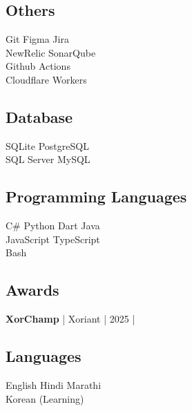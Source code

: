 \documentclass[]{deedy-resume-reversed}
\begin{document}
\begin{minipage}[t]{0.33\textwidth}
\subsection{Others}
Git \textbullet Figma \textbullet Jira \\
NewRelic \textbullet SonarQube \\
Github Actions \\
Cloudflare Workers \\
\sectionsep

\subsection{Database}
SQLite \textbullet PostgreSQL \\
SQL Server \textbullet MySQL \\
\sectionsep

\subsection{Programming Languages}
C\# \textbullet{} Python \textbullet{} Dart \textbullet{} Java \\
JavaScript \textbullet{} TypeScript \\
Bash
\sectionsep

\subsection{Awards}
\textbf{XorChamp} | Xoriant | 2025  | 
\href{https://github.com/sunnydodti/resume/blob/main/awards/XorChamp%20-%20Sunny%20Dodti.pdf}{\faExternalLink } 
\sectionsep

\subsection{Languages}
English \textbullet{} Hindi \textbullet{} Marathi \\
Korean (Learning) 
\sectionsep

\end{minipage}
\end{document}
